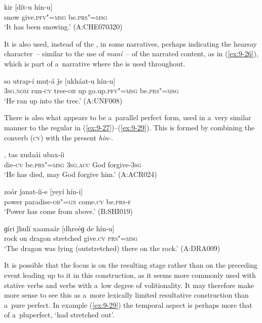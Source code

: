 \begin{exe}
\ex
\label{ex:9-25}
\gll kir [dít-u hín-u] \\
snow give.\textsc{pfv"=msg} be.\textsc{prs"=msg} \\
\glt `It has been snowing.' (A:CHE070320)
\end{exe}

It is also used, instead of the , in some narratives, perhaps indicating the hearsay character~-- similar to the use of \textit{maní}~-- of the narrated content, as in (\ref{ex:9-26}), which is part of a~narrative where the  is used throughout.

\begin{exe}
\ex
\label{ex:9-26}
\gll so utrap-í muṭ-á ǰe [ukháat-u hín-u] \\
\textsc{3sg.nom} run-\textsc{cv} tree-\textsc{ob} up go.up.\textsc{pfv"=msg} be.\textsc{prs"=msg} \\
\glt `He ran up into the tree.' (A:UNF008) 
\end{exe}

There is also what appears to be a~parallel perfect form, used in a~very similar manner to the regular  in (\ref{ex:9-27})--(\ref{ex:9-29}). This is formed by combining the converb (\textsc{cv}) with the present   \textit{hin-}.

\begin{exe}
\ex
\label{ex:9-27}
, tas xudaái ubax-íi \\
die-\textsc{cv} be.\textsc{prs"=msg} \textsc{3sg.acc} God forgive-\textsc{3sg} \\
\glt `He has died, may God forgive him.' (A:ACR024)

\ex
\label{ex:9-28}
\gll zoór ǰanat-íi-e [yeyí hín-i] \\
power paradise-\textsc{ob"=gn} come.\textsc{cv} be.\textsc{prs-f} \\
\glt `Power has come from above.' (B:SHI019)

\ex
\label{ex:9-29}
\gll ɡíri ǰhulí xaamaár [dhreéɡ de hín-u] \\
rock on dragon stretched give.\textsc{cv} \textsc{prs"=msg} \\
\glt `The dragon was lying (outstretched) there on the rock.' (A:DRA009)
\end{exe}

It is possible that the focus is on the resulting stage rather than on the preceding event leading up to it in this construction, as it seems more commonly used with stative verbs and verbs with a~low degree of volitionality. It may therefore make more sense to see this as a~more lexically limited resultative construction \citep[135]{dahl1985} than a~pure perfect. In example (\ref{ex:9-29}) the temporal aspect is perhaps more that of a~pluperfect, `had stretched out'. 



